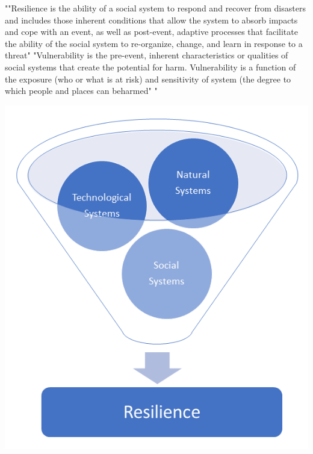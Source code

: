 \documentclass{article}
\begin{document}
""Resilience is the ability of a social system to respond and recover from disasters and includes those inherent conditions that allow the system to absorb impacts and cope with an event, as well as post-event, adaptive processes that facilitate the ability of the social system to re-organize, change, and learn in response to a threat" "Vulnerability is the pre-event, inherent characteristics or qualities of social systems that create the potential for harm. Vulnerability is a function of the exposure (who or what is at risk) and sensitivity of system (the degree to which people and places can beharmed" " \cite{cutter_place-based_2008}

\includegraphics[scale=0.5]{fig_theory/resilience model .png}
\end{document}
